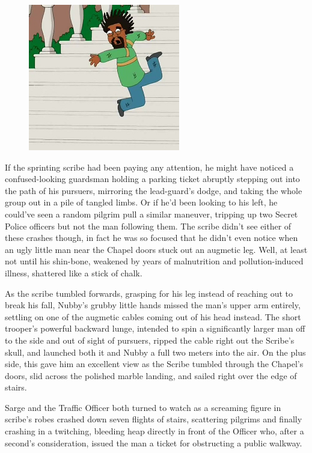 \begin{figure}
	\begin{center}
		\includegraphics[width=\figwidth]{pics/17/47.png}
	\end{center}
\end{figure}
If the sprinting scribe had been paying any attention, he might have noticed a confused-looking guardsman holding a parking ticket abruptly stepping out into the path of his pursuers, mirroring the lead-guard's dodge, and taking the whole group out in a pile of tangled limbs. 
Or if he'd been looking to his left, he could've seen a random pilgrim pull a similar maneuver, tripping up two Secret Police officers but not the man following them. 
The scribe didn't see either of these crashes though, in fact he was so focused that he didn't even notice when an ugly little man near the Chapel doors stuck out an augmetic leg. 
Well, at least not until his shin-bone, weakened by years of malnutrition and pollution-induced illness, shattered like a stick of chalk.

As the scribe tumbled forwards, grasping for his leg instead of reaching out to break his fall, Nubby's grubby little hands missed the man's upper arm entirely, settling on one of the augmetic cables coming out of his head instead. 
The short trooper's powerful backward lunge, intended to spin a significantly larger man off to the side and out of sight of pursuers, ripped the cable right out the Scribe's skull, and launched both it and Nubby a full two meters into the air. 
On the plus side, this gave him an excellent view as the Scribe tumbled through the Chapel's doors, slid across the polished marble landing, and sailed right over the edge of stairs.

Sarge and the Traffic Officer both turned to watch as a screaming figure in scribe's robes crashed down seven flights of stairs, scattering pilgrims and finally crashing in a twitching, bleeding heap directly in front of the Officer who, after a second's consideration, issued the man a ticket for obstructing a public walkway.

